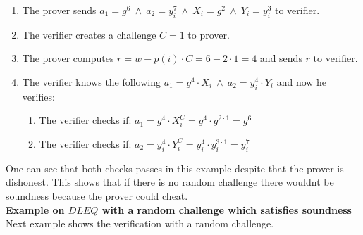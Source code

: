 \begin{enumerate}
    \item The prover sends \begin{math}a_1=g^6 \ \land\ a_2=y_i^7 \ \land \ X_i=g^2 \ \land \ Y_i=y_i^3 \end{math} to verifier.
    \item The verifier creates a challenge \begin{math}C=1 \end{math} to prover.
    \item The prover computes \begin{math}r=w-p(i)  \cdot  C = 6-2  \cdot  1= 4\end{math} and sends $r$ to verifier.
    \item The verifier knows the following  \begin{math}a_1=g^4  \cdot  X_i \ \land \ a_2=y_i^4  \cdot  Y_i \end{math} and now he verifies:
    \begin{enumerate}        
        \item The verifier checks if:  \begin{math}a_1 = g^4 \cdot X_i^C = g^4 \cdot g^{2 \cdot 1} = g^6\end{math}
        \item The verifier checks if:  \begin{math} a_2=y_i^4  \cdot  Y_i^C = y_i^4  \cdot  y_i^{3 \cdot 1}= y_i^7 \end{math}
    \end{enumerate}
\end{enumerate}


\noindent
One can see that both checks passes in this example despite that the prover is dishonest. This shows that if there is no random challenge there wouldnt be soundness because the prover could cheat.\\

\noindent
\textbf{Example on $DLEQ$ with a random challenge which satisfies soundness}\\
Next example shows the verification with a random challenge.

